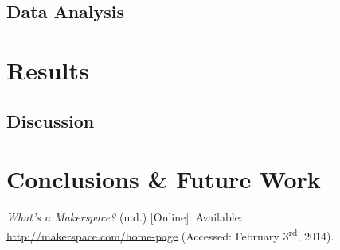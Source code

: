 \documentclass[a4paper, 11pt]{article}
\begin{document}
\subsection{Data Analysis}

\section{Results}

\subsection{Discussion}

\section{Conclusions \& Future Work}


\newpage

\begin{thebibliography}{9}
     \emph{What’s a Makerspace?} (n.d.) [Online]. Available: \\ \href{http://makerspace.com/home-page}{http://makerspace.com/home-page} (Accessed: February 3\textsuperscript{rd}, 2014).
\end{thebibliography}
\end{document}
